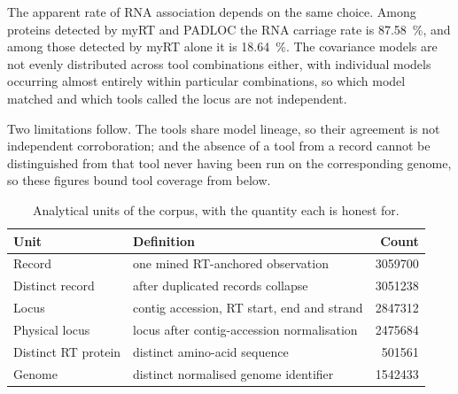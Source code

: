 The apparent rate of RNA association depends on the same choice. Among proteins detected by myRT and
PADLOC the RNA carriage rate is \SI{87.58}{\percent}, and among those detected by myRT alone it is
\SI{18.64}{\percent}. The covariance models are not evenly distributed across tool combinations
either, with individual models occurring almost entirely within particular combinations, so which
model matched and which tools called the locus are not independent.

Two limitations follow. The tools share model lineage, so their agreement is not independent
corroboration; and the absence of a tool from a record cannot be distinguished from that tool never
having been run on the corresponding genome, so these figures bound tool coverage from below.


\begin{table}[htbp]
\centering
\caption[Analytical units]{Analytical units of the corpus, with the quantity each is honest for.}
\label{tab:units}
\begin{tabular}{llr}
\toprule
Unit & Definition & Count \\
\midrule
Record                & one mined RT-anchored observation                    & \num{3059700} \\
Distinct record       & after duplicated records collapse                    & \num{3051238} \\
Locus                 & contig accession, RT start, end and strand           & \num{2847312} \\
Physical locus        & locus after contig-accession normalisation           & \num{2475684} \\
Distinct RT protein   & distinct amino-acid sequence                         & \num{501561}  \\
Genome                & distinct normalised genome identifier                & \num{1542433} \\
\bottomrule
\end{tabular}
\end{table}

